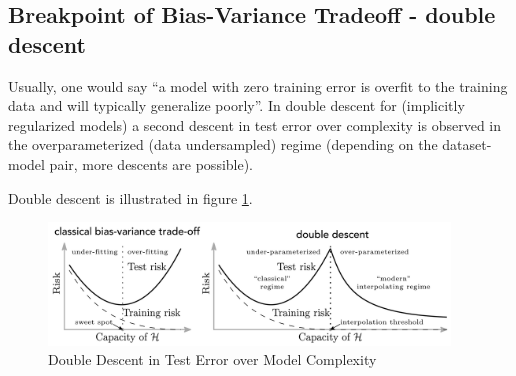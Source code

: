 \subsection{Breakpoint of Bias-Variance Tradeoff - double descent}
Usually, one would say \enquote{a model with zero training error is overfit to the training data and
will typically generalize poorly}. In double descent for (implicitly regularized models) a 
second descent in test error over complexity is observed in the overparameterized (data undersampled) regime
(depending on the dataset-model pair, more descents are possible).


Double descent is illustrated in figure \ref{fig:double_descent}.

\begin{figure}[!htb]
    \centering
    \includegraphics[width=0.95\textwidth]{figures/bvt.pdf}
    \caption{Double Descent in Test Error over Model Complexity}
    \label{fig:double_descent}
\end{figure}


